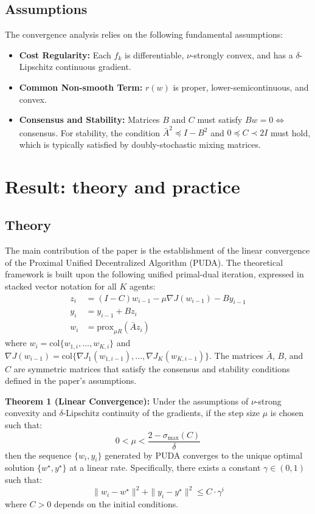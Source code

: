 \documentclass[10pt,english]{article}
\begin{document}
\subsection{Assumptions}

The convergence analysis relies on the following fundamental assumptions:
\begin{itemize}
\item \textbf{Cost Regularity:} Each $f_k$ is differentiable, $\nu$-strongly convex, and has a $\delta$-Lipschitz continuous gradient.
\item \textbf{Common Non-smooth Term:} $r(w)$ is proper, lower-semicontinuous, and convex.
\item \textbf{Consensus and Stability:} Matrices $B$ and $C$ must satisfy $Bw=0 \iff$ consensus. For stability, the condition $\bar A^2 \preceq I-B^2$ and $0 \preceq C \prec 2I$ must hold, which is typically satisfied by doubly-stochastic mixing matrices.
\end{itemize}

\section{Result: theory and practice}

\subsection{Theory}

The main contribution of the paper is the establishment of the linear convergence of the Proximal Unified Decentralized Algorithm (PUDA).
The theoretical framework is built upon the following unified primal-dual iteration, expressed in stacked vector notation for all $K$ agents:
\begin{align}
z_i &= (I-C)w_{i-1} - \mu \nabla J(w_{i-1}) - By_{i-1} \label{eq:puda-z}\\
y_i &= y_{i-1} + Bz_i \label{eq:puda-y}\\
w_i &= \mathrm{prox}_{\mu R}(\bar A z_i) \label{eq:puda-w}
\end{align}
where $w_i = \mathrm{col}\{w_{1,i}, \ldots, w_{K,i}\}$ and $\nabla J(w_{i-1}) = \mathrm{col}\{\nabla J_1(w_{1,i-1}), \ldots, \nabla J_K(w_{K,i-1})\}$.
The matrices $\bar A$, $B$, and $C$ are symmetric matrices that satisfy the consensus and stability conditions defined in the paper's assumptions.

\textbf{Theorem 1 (Linear Convergence):}
Under the assumptions of $\nu$-strong convexity and $\delta$-Lipschitz continuity of the gradients, if the step size $\mu$ is chosen such that:
\begin{equation}
0 < \mu < \frac{2-\sigma_{\max}(C)}{\delta}
\end{equation}
then the sequence $\{w_i, y_i\}$ generated by PUDA converges to the unique optimal solution $\{w^\star, y^\star\}$ at a linear rate.
Specifically, there exists a constant $\gamma \in (0,1)$ such that:
\begin{equation}
\|w_i - w^\star\|^2 + \|y_i - y^\star\|^2 \le C \cdot \gamma^i
\end{equation}
where $C > 0$ depends on the initial conditions.
\end{document}
